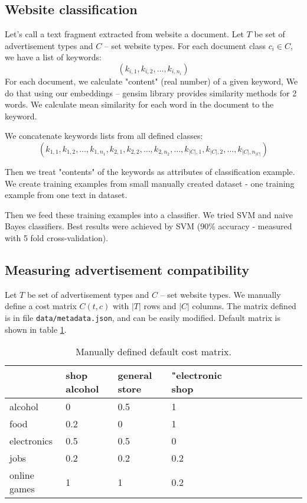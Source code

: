 \documentclass[a4paper]{article}
\begin{document}
\subsection{Website classification}

Let's call a text fragment extracted from website a document.
Let $T$ be set of advertisement types and $C$ -- set website types.
For each document class $c_i\in{C}$, we have a list of keywords:
\begin{equation}
    (k_{i,1}, k_{i,2}, \ldots, k_{i, n_i})
\end{equation}
For each document, we calculate "content" (real number) of a given keyword,
We do that using our embeddings -- gensim library provides similarity methods for 2 words.
We calculate mean similarity for each word in the document to the keyword.

We concatenate keywords lists from all defined classes:
\begin{equation}
    (k_{1,1}, k_{1,2}, \ldots, k_{1, n_1},
    k_{2,1}, k_{2,2}, \ldots, k_{2, n_2},
    \ldots,
    k_{|C|,1}, k_{|C|,2}, \ldots, k_{|C|, n_{|C|}})
\end{equation}

Then we treat "contents" of the keywords as attributes of classification example.
We create training examples from small manually created dataset - one training example from one text in dataset.

Then we feed these training examples into a classifier.
We tried SVM and naive Bayes classifiers.
Best results were achieved by SVM (90\% accuracy - measured with 5 fold cross-validation).

\subsection{Measuring advertisement compatibility}
\label{mainlogic}

Let $T$ be set of advertisement types and $C$ -- set website types.
We manually define a cost matrix $C(t, c)$ 
with $|T|$ rows and $|C|$ columns.
The matrix defined is in file \texttt{data/metadata.json},
and can be easily modified. Default matrix is shown in table \ref{table:costmx}.

\begin{table}[!hbt]
    \caption{Manually defined default cost matrix.
    \label{table:costmx}
    }
\footnotesize
\begin{center}
    \begin{tabular}{|l|l|l|l|l|l|l|l|l|l|l|}
    \hline
        & shop alcohol & general store  & "electronic shop \\
    \hline
          alcohol & 0& 0.5&   1 \\
    \hline
        food & 0.2&   0&   1 \\
    \hline
        electronics & 0.5& 0.5&   0 \\
    \hline
        jobs & 0.2& 0.2& 0.2 \\
    \hline
          online games & 1&   1& 0.2 \\
    \hline
    \end{tabular}
\end{center}
\end{table}
\end{document}
